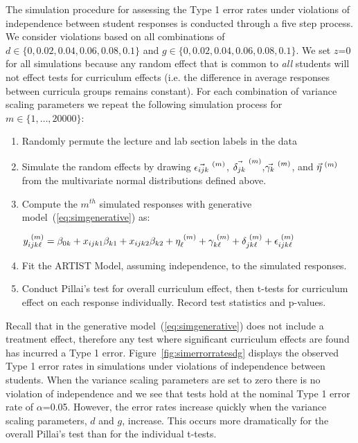 \documentclass[11pt]{isuthesis}\usepackage[]{graphicx}\usepackage[]{color}
\newcommand{\km}[1]{{\color{red} #1}}
\begin{document}
\km{The simulation procedure for assessing the Type 1 error rates under violations of independence between student responses is conducted through a five step process. We consider violations based on all combinations of $d \in \{0,0.02,0.04,0.06,0.08,0.1\}$ and $g \in \{0,0.02,0.04,0.06,0.08,0.1\}$. We set $z$=0 for all simulations because any random effect that is common to \textit{all} students will not effect tests for curriculum effects (i.e. the difference in average responses between curricula groups remains constant). For each combination of variance scaling parameters we repeat the following simulation process for $m \in \{1,\dots,20000\}$: 
%
\begin{enumerate}
\item Randomly permute the lecture and lab section labels in the data 
\item Simulate the random effects by drawing $\vec{\epsilon_{ijk}}^{\hspace{.1cm}(m)}$, $\vec{\delta_{jk}}^{\hspace{.1cm}(m)}$,$\vec{\gamma_{k}}^{\hspace{.1cm}(m)}$, and $\vec{\eta}^{\hspace{.1cm}(m)}$ from the multivariate normal distributions defined above.
\item Compute the $m^{th}$ simulated responses with generative model~(\ref{eq:simgenerative}) as:
%
\begin{center}
$y_{ijk\ell}^{\hspace{.1cm}(m)} = \beta_{0k} + x_{ijk1}\beta_{k1} + x_{ijk2}\beta_{k2} + \eta_{\ell}^{\hspace{.1cm}(m)} + \gamma_{k\ell}^{\hspace{.1cm}(m)} + \delta_{jk\ell}^{\hspace{.1cm}(m)} + \epsilon_{ijk\ell}^{\hspace{.1cm}(m)}$
\end{center}
%
\item Fit the ARTIST Model, assuming independence, to the simulated responses.
\item Conduct Pillai's test for overall curriculum effect, then t-tests for curriculum effect on each response individually. Record test statistics and p-values.
\end{enumerate}
}

\km{Recall that in the generative model~(\ref{eq:simgenerative}) does not include a treatment effect, therefore any test where significant curriculum effects are found has incurred a Type 1 error. Figure~\ref{fig:simerrorratesdg} displays the observed Type 1 error rates in simulations under violations of independence between students. When the variance scaling parameters are set to zero there is no violation of independence and we see that tests hold at the nominal Type 1 error rate of $\alpha$=0.05. However, the error rates increase quickly when the variance scaling parameters, $d$ and $g$, increase. This occurs more dramatically for the overall Pillai's test than for the individual t-tests.}
\end{document}

